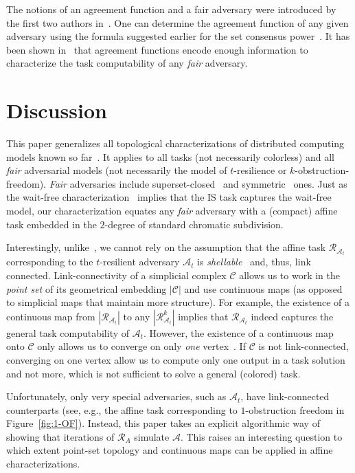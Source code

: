 \documentclass[a4paper]{article}
\def\A{\ensuremath{\mathcal{A}}}
\def\R{\ensuremath{\mathcal{R}}}
\def\C{\ensuremath{\mathcal{C}}}
\def\fair{\textit{fair}}
\def\Fair{\textit{Fair}}
\begin{document}
The notions of an agreement function and a fair adversary were introduced by the first two
authors in~\cite{KR17}.
One can determine the agreement function of any given adversary
using the formula suggested earlier for the
set consensus power~\cite{GK10}. 
It has been shown in~\cite{KR17} that agreement functions encode enough information to
characterize the task computability of any {\fair}
adversary.
%



\section{Discussion}
\label{sec:disc}
%
This paper generalizes all topological
characterizations of distributed computing models known so
far~\cite{HS99,GKM14-podc,GHKR16,SHG16}.
It applies to all tasks (not necessarily colorless) and all {\fair}
adversarial models (not necessarily the model of $t$-resilience or $k$-obstruction-freedom).
{\Fair} adversaries include superset-closed~\cite{Kuz12} and symmetric~\cite{Tau10}
ones. 
%
Just as the wait-free characterization~\cite{HS99} implies that the IS task captures the
wait-free model, our characterization equates any {\fair} adversary with
a (compact) affine task embedded in the $2$-degree of standard chromatic subdivision.  

Interestingly, unlike~\cite{SHG16}, we cannot
rely on the assumption that the 
affine task $\R_{\A_t}$ corresponding to the $t$-resilient adversary $\A_t$
is \emph{shellable}~\cite{HKR14} and, thus, link
connected.
%
Link-connectivity of a simplicial complex $\C$ allows us to work in the \emph{point
set} of its geometrical embedding $|\C|$ and use continuous maps (as opposed to
simplicial maps that maintain more structure).
%
For example, the existence of a continuous map from $|\R_{\A_t}|$ to
any $|\R_{\A_t}^k|$ implies that $\R_{\A_t}$ indeed captures the
general task computability of $\A_t$.
%
However, the existence of a continuous map onto $\C$ only allows us to
converge on only \emph{one} vertex~\cite{HKR14}.
If $\C$ is not link-connected, converging on one vertex allow
us to compute only one output in a task solution and not more, which is not
sufficient to solve a general (colored) task.      

%
Unfortunately, only very special adversaries, such as $\A_t$, have
link-connected counterparts (see, e.g., 
the affine task corresponding to $1$-obstruction freedom in Figure~\ref{fig:1-OF}). 
%
Instead, this paper takes an explicit algorithmic way of
showing that iterations of $\R_{A}$ simulate $\A$.   
%
This raises an interesting question to which extent point-set topology
and continuous maps can be applied in affine characterizations.  
\end{document}
